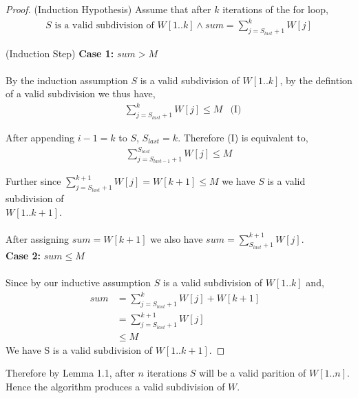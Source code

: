 \documentclass[12pt]{article}
\newenvironment{lemma}[2][Lemma]{\begin{trivlist}
\item[\hskip \labelsep {\bfseries #1}\hskip \labelsep {\bfseries #2.}]}{\end{trivlist}}
\newenvironment{question}[2][Question]{\begin{trivlist}
\item[\hskip \labelsep {\bfseries #1}\hskip \labelsep {\bfseries #2.}]}{\end{trivlist}}
\begin{document}
\begin{question}{1}
\begin{lemma}{1.1}
\begin{proof}
      (Induction Hypothesis) Assume that after $k$ iterations of the for loop,
      \begin{align*}
        S \text{ is a valid subdivision of } W[1..k] \land sum = \sum_{j = S_{last} + 1}^{k} W[j]
      \end{align*}

      (Induction Step)
      \textbf{Case 1:} $sum > M$ \\ \\
      By the induction assumption $S$ is a valid subdivision of $W[1..k]$, by the defintion of
      a valid subdivision we thus have,
      \begin{align*}
        & \sum_{j = S_{last} + 1}^{k} W[j] \leq M & \text{(I)}
      \end{align*}

      After appending $i - 1 = k$ to $S$, $S_{last} = k$.  Therefore (I) is equivalent to,
      \begin{align*}
        \sum_{j = S_{last - 1} + 1}^{S_{last}} W[j] \leq M
      \end{align*}

      Further since $\sum_{j = S_{last} + 1}^{k+1} W[j] = W[k+1] \leq M$ we have
      $S$ is a valid subdivision of \\
      $W[1..k+1]$. \\ \\
      After assigning $sum = W[k + 1]$ we also have $sum = \sum_{S_{last} +1}^{k+1} W[j]$. \\

      \textbf{Case 2:} $sum \leq M$ \\ \\
      Since by our inductive assumption $S$ is a valid subdivision of $W[1..k]$ and,
      \begin{align*}
        sum & = \sum_{j=S_{last} + 1}^{k} W[j] + W[k+1] & \\
            & = \sum_{j=S_{last} + 1}^{k+1} W[j] & \\
            & \leq M &
      \end{align*}
      We have S is a valid subdivision of $W[1..k+1]$.
    \end{proof}

    Therefore by Lemma 1.1, after $n$ iterations $S$ will be a valid parition of
    $W[1..n]$. \\
    Hence the algorithm produces a valid subdivision of $W$.
  \end{lemma}
\end{question}
\end{document}
